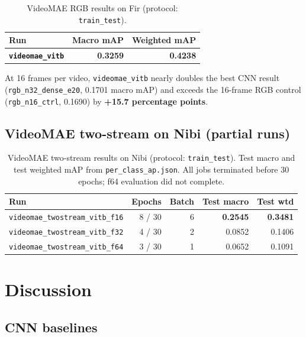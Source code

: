 \documentclass[11pt,a4paper]{article}
\begin{document}
\begin{table}[h]
\centering
\caption{VideoMAE RGB results on Fir (protocol: \texttt{train\_test}).}
\label{tab:fir-videomae}
\begin{tabular}{@{}lrr@{}}
\toprule
Run & Macro mAP & Weighted mAP \\
\midrule
\textbf{\texttt{videomae\_vitb}} & \textbf{0.3259} & \textbf{0.4238} \\
\bottomrule
\end{tabular}
\end{table}

\noindent
At 16 frames per video, \texttt{videomae\_vitb} nearly doubles the best CNN result
(\texttt{rgb\_n32\_dense\_e20}, 0.1701 macro mAP) and exceeds the 16-frame RGB control
(\texttt{rgb\_n16\_ctrl}, 0.1690) by \textbf{+15.7 percentage points}.


\subsection{VideoMAE two-stream on Nibi (partial runs)}

\begin{table}[h]
\centering
\caption{VideoMAE two-stream results on Nibi (protocol: \texttt{train\_test}). Test macro and test weighted mAP from \texttt{per\_class\_ap.json}. All jobs terminated before 30 epochs; f64 evaluation did not complete.}
\label{tab:nibi-results}
\begin{tabular}{@{}lrrrr@{}}
\toprule
Run & Epochs & Batch & Test macro & Test wtd \\
\midrule
\texttt{videomae\_twostream\_vitb\_f16} & 8 / 30 & 6 & \textbf{0.2545} & \textbf{0.3481} \\
\texttt{videomae\_twostream\_vitb\_f32} & 4 / 30 & 2 & 0.0852 & 0.1406 \\
\texttt{videomae\_twostream\_vitb\_f64} & 3 / 30 & 1 &  0.0652  & 0.1091 \\
\bottomrule
\end{tabular}
\end{table}

\section{Discussion}

\subsection{CNN baselines}
\end{document}
